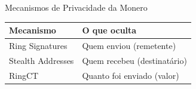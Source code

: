 \documentclass{libs/ufc_format}
\begin{document}
\begin{frame}{Mecanismos de Privacidade da Monero}
    \begin{table}
        \centering
        \begin{tabular}{ll}
            \toprule
            \textbf{Mecanismo} & \textbf{O que oculta} \\
            \midrule
            Ring Signatures & Quem enviou (remetente) \\
            Stealth Addresses & Quem recebeu (destinatário) \\
            RingCT & Quanto foi enviado (valor) \\
            \bottomrule
        \end{tabular}
    \end{table}

    \vspace{0.3cm}

\end{frame}
\end{document}

